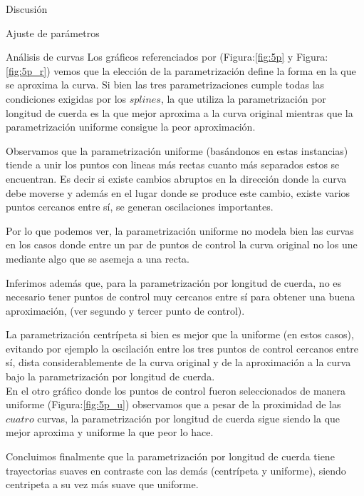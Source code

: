 \begin{section}{Discusión}
\begin{subsection}{Ajuste de parámetros}
\end{subsection}
\begin{subsection}{Análisis de curvas}
	Los gráficos referenciados por (Figura:\ref{fig:5p} y Figura:\ref{fig:5p_r}) vemos que la elección de la parametrización define la forma en la que se aproxima la curva. Si bien las tres parametrizaciones cumple todas las condiciones exigidas por los $splines$, la que utiliza la parametrización por longitud de cuerda es la que mejor aproxima a la curva original mientras que la parametrización uniforme consigue la peor aproximación.
	
	Observamos que la parametrización uniforme (basándonos en estas instancias) tiende a unir los puntos con lineas más rectas cuanto más separados estos se encuentran. Es decir si existe cambios abruptos en la dirección donde la curva debe moverse y además en el lugar donde se produce este cambio, existe varios puntos cercanos entre sí, se generan oscilaciones importantes.  
	
	
	Por lo que podemos ver, la parametrización uniforme no modela bien las curvas en los casos donde entre un par de puntos de control la curva original no los une mediante algo que se asemeja a una recta.
	
	Inferimos además que, para la parametrización por longitud de cuerda, no es necesario tener puntos de control muy cercanos entre sí para obtener una buena aproximación, (ver segundo y tercer punto de control).
	
	La parametrización centrípeta si bien es mejor que la uniforme (en estos casos), evitando por ejemplo la oscilación entre los tres puntos de control cercanos entre sí, dista considerablemente de la curva original y de la aproximación a la curva bajo la parametrización por longitud de cuerda.\\
	
	En el otro gráfico donde los puntos de control fueron seleccionados de manera uniforme (Figura:\ref{fig:5p_u}) observamos que a pesar de la proximidad de las $cuatro$ curvas, la parametrización por longitud de cuerda sigue siendo la que mejor aproxima y uniforme la que peor lo hace.
	
	Concluimos finalmente que la parametrización por longitud de cuerda tiene trayectorias suaves en contraste con las demás (centrípeta y uniforme), siendo centripeta a su vez más suave que uniforme. 
	

\end{subsection}
\end{section}
